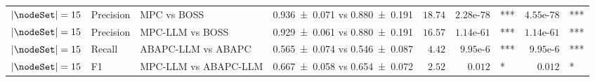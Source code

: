 \begin{table}[t]
{\begin{tabular}{ll l|c|r|rl|rl}
    $|\nodeSet|=15$ & Precision & MPC vs BOSS & \num{0.936 +- 0.071} vs \num{0.880 +- 0.191} & $18.74$ & $2.28\text{e-}78$ & \!\!\!*** & $4.55\text{e-}78$ & \!\!\!*** \\
    $|\nodeSet|=15$ & Precision & MPC-LLM vs BOSS & \num{0.929 +- 0.061} vs \num{0.880 +- 0.191} & $16.57$ & $1.14\text{e-}61$ & \!\!\!*** & $1.14\text{e-}61$ & \!\!\!*** \\
    $|\nodeSet|=15$ & Recall & ABAPC-LLM vs ABAPC & \num{0.565 +- 0.074} vs \num{0.546 +- 0.087} & $4.42$ & $9.95\text{e-}6$ & \!\!\!*** & $9.95\text{e-}6$ & \!\!\!*** \\
    $|\nodeSet|=15$ & F1 & MPC-LLM vs ABAPC-LLM & \num{0.667 +- 0.058} vs \num{0.654 +- 0.072} & $2.52$ & $0.012$ & \!\!\!* & $0.012$ & \!\!\!* \\
    \bottomrule
    \end{tabular}
    }
\end{table}
